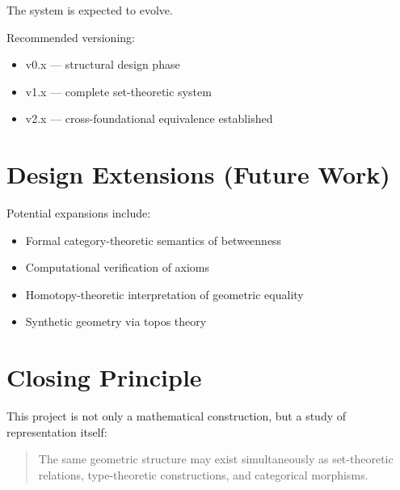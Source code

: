 \documentclass{book}
\begin{document}
The system is expected to evolve.

Recommended versioning:

\begin{itemize}
    \item v0.x — structural design phase
    \item v1.x — complete set-theoretic system
    \item v2.x — cross-foundational equivalence established
\end{itemize}

\section{Design Extensions (Future Work)}

Potential expansions include:

\begin{itemize}
    \item Formal category-theoretic semantics of betweenness
    \item Computational verification of axioms
    \item Homotopy-theoretic interpretation of geometric equality
    \item Synthetic geometry via topos theory
\end{itemize}

\section{Closing Principle}

This project is not only a mathematical construction, but a study of representation itself:

\begin{quote}
The same geometric structure may exist simultaneously as set-theoretic relations, type-theoretic constructions, and categorical morphisms.
\end{quote}
\end{document}
